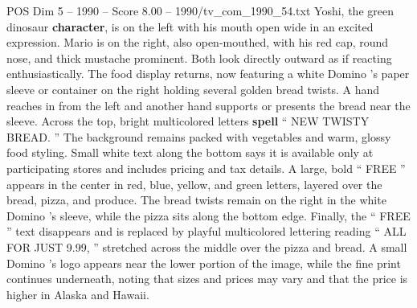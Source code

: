 \begin{textsample}{POS Dim 5 – 1990 – Score 8.00 – 1990/tv\_com\_1990\_54.txt}
Yoshi, the green dinosaur \textbf{character}, is on the left with his mouth open wide in an excited expression.
Mario is on the right, also open-mouthed, with his red cap, round nose, and thick mustache prominent.
Both look directly outward as if reacting enthusiastically.
The food display returns, now featuring a white Domino ’s paper sleeve or container on the right holding several golden bread twists.
A hand reaches in from the left and another hand supports or presents the bread near the sleeve.
Across the top, bright multicolored letters \textbf{spell} “ NEW TWISTY BREAD. ” The background remains packed with vegetables and warm, glossy food styling.
Small white text along the bottom says it is available only at participating stores and includes pricing and tax details.
A large, bold “ FREE ” appears in the center in red, blue, yellow, and green letters, layered over the bread, pizza, and produce.
The bread twists remain on the right in the white Domino ’s sleeve, while the pizza sits along the bottom edge.
Finally, the “ FREE ” text disappears and is replaced by playful multicolored lettering reading “ ALL FOR JUST 9.99, ” stretched across the middle over the pizza and bread.
A small Domino ’s logo appears near the lower portion of the image, while the fine print continues underneath, noting that sizes and prices may vary and that the price is higher in Alaska and Hawaii.

\end{textsample}
